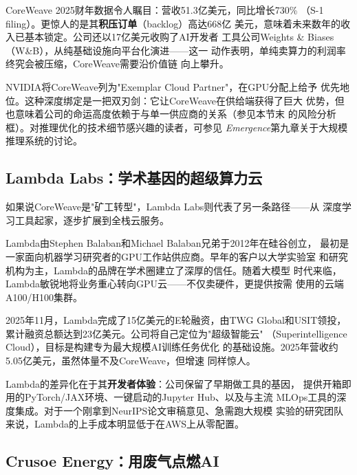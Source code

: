 CoreWeave 2025财年数据令人瞩目：营收51.3亿美元，同比增长730\%
（S-1 filing）。更惊人的是其\textbf{积压订单}（backlog）高达668亿
美元，意味着未来数年的收入已基本锁定。公司还以17亿美元收购了AI开发者
工具公司Weights \& Biases（W\&B），从纯基础设施向平台化演进——这一
动作表明，单纯卖算力的利润率终究会被压缩，CoreWeave需要沿价值链
向上攀升。

NVIDIA将CoreWeave列为"Exemplar Cloud Partner"，在GPU分配上给予
优先地位。这种深度绑定是一把双刃剑：它让CoreWeave在供给端获得了巨大
优势，但也意味着公司的命运高度依赖于与单一供应商的关系（参见本节末
的风险分析框）。对推理优化的技术细节感兴趣的读者，可参见
\textit{Emergence}第九章关于大规模推理系统的讨论。

\subsection{Lambda Labs：学术基因的超级算力云}
\label{subsec:lambda}

如果说CoreWeave是"矿工转型"，Lambda Labs则代表了另一条路径——从
深度学习工具起家，逐步扩展到全栈云服务。

Lambda由Stephen Balaban和Michael Balaban兄弟于2012年在硅谷创立，
最初是一家面向机器学习研究者的GPU工作站供应商。早年的客户以大学实验室
和研究机构为主，Lambda的品牌在学术圈建立了深厚的信任。随着大模型
时代来临，Lambda敏锐地将业务重心转向GPU云——不仅卖硬件，更提供按需
使用的云端A100/H100集群。

2025年11月，Lambda完成了15亿美元的E轮融资，由TWG Global和USIT领投，
累计融资总额达到23亿美元。公司将自己定位为"超级智能云"
（Superintelligence Cloud），目标是构建专为最大规模AI训练任务优化
的基础设施。2025年营收约5.05亿美元，虽然体量不及CoreWeave，但增速
同样惊人。

Lambda的差异化在于其\textbf{开发者体验}：公司保留了早期做工具的基因，
提供开箱即用的PyTorch/JAX环境、一键启动的Jupyter Hub、以及与主流
MLOps工具的深度集成。对于一个刚拿到NeurIPS论文审稿意见、急需跑大规模
实验的研究团队来说，Lambda的上手成本明显低于在AWS上从零配置。

\subsection{Crusoe Energy：用废气点燃AI}
\label{subsec:crusoe}

